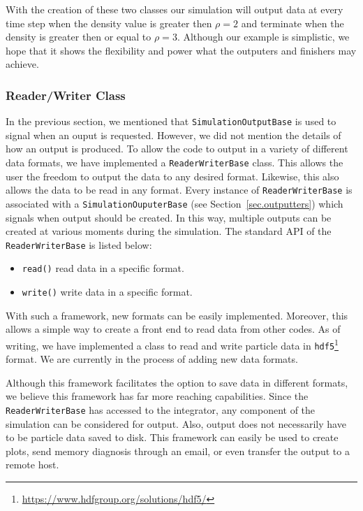With the creation of these two classes our simulation will output data at every time
step when the density value is greater then $\rho=2$ and terminate when the density is greater
then or equal to $\rho=3$. Although our example is simplistic, we hope that it shows the 
flexibility and power what the outputers and finishers may achieve.  

\subsubsection{Reader/Writer Class}
In the previous section, we mentioned that \lstinline{SimulationOutputBase} is used to
signal when an ouput is requested. However, we did not mention the details of how an output
is produced.
To allow the code to output in a variety of different data formats, we have implemented 
a \lstinline{ReaderWriterBase} class. This allows the user the freedom to
output the data to any desired format. Likewise, this also allows the data to be
read in any format. Every instance of \lstinline{ReaderWriterBase} is associated with a 
\lstinline{SimulationOuputerBase} (see Section~\ref{sec.outputters}) which signals when
output should be created. In this way, multiple outputs can be created at various
moments during the simulation. The standard API of the \lstinline{ReaderWriterBase} is
listed below:
\begin{itemize}
	\item \lstinline{read()} read data in a specific format.
    \item \lstinline{write()} write data in a specific format.
\end{itemize}
With such a framework, new formats can be easily implemented. Moreover, this
allows a simple way to create a front end to read data from other codes. As of writing,
we have implemented a class to read and write particle data in
\texttt{hdf5}\footnote{\url{https://www.hdfgroup.org/solutions/hdf5/}} format. We are
currently in the process of adding new data formats.

Although this framework facilitates the option to save data in different formats,
we believe this framework has far more reaching capabilities. Since the \lstinline{ReaderWriterBase}
has accessed to the integrator, any component of the simulation can be considered for
output. Also, output does not necessarily have to be particle data saved to disk. This framework
can easily be used to create plots, send memory diagnosis through an
email, or even transfer the output to a remote host.


